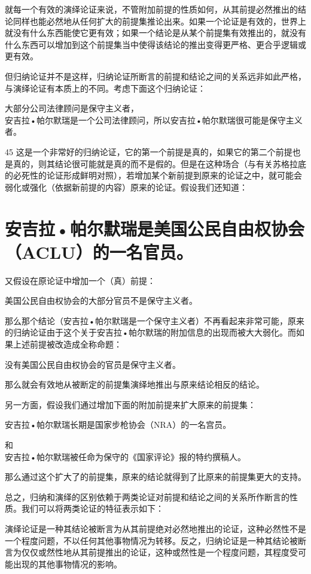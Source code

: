 就每一个有效的演绎论证来说，不管附加前提的性质如何，从其前提必然推出的结论同样也能必然地从任何扩大的前提集推论出来。如果一个论证是有效的，世界上就没有什么东西能使它更有效；如果一个结论是从某个前提集有效推出的，就没有什么东西可以增加到这个前提集当中使得该结论的推出变得更严格、更合乎逻辑或更有效。

但归纳论证并不是这样，归纳论证所断言的前提和结论之间的关系远非如此严格，与演绎论证有本质上的不同。考虑下面这个归纳论证：

\begin{displayquote}
大部分公司法律顾问是保守主义者，\\
安吉拉•帕尔默瑞是一个公司法律顾问，所以安吉拉•帕尔默瑞很可能是保守主义者。
\end{displayquote}

45 这是一个非常好的归纳论证，它的第一个前提是真的，如果它的第二个前提也是真的，则其结论很可能就是真的而不是假的。但是在这种场合（与有关苏格拉底的必死性的论证形成鲜明对照），若增加某个新前提到原来的论证之中，就可能会弱化或强化（依据新前提的内容）原来的论证。假设我们还知道：

\section*{安吉拉•帕尔默瑞是美国公民自由权协会（ACLU）的一名官员。}
又假设在原论证中增加一个（真）前提：

美国公民自由权协会的大部分官员不是保守主义者。

那么那个结论（安吉拉•帕尔默瑞是一个保守主义者）不再看起来非常可能，原来的归纳论证由于这个关于安吉拉•帕尔默瑞的附加信息的出现而被大大弱化。而如果上述前提被改造成全称命题：

没有美国公民自由权协会的官员是保守主义者。

那么就会有效地从被断定的前提集演绎地推出与原来结论相反的结论。

另一方面，假设我们通过增加下面的附加前提来扩大原来的前提集：

安吉拉•帕尔默瑞长期是国家步枪协会（NRA）的一名宫员。

和\\
安吉拉•帕尔默瑞被任命为保守的《国家评论》报的特约撰稿人。

那么通过这个扩大了的前提集，原来的结论就得到了比原来的前提集更大的支持。

总之，归纳和演绎的区别依赖于两类论证对前提和结论之间的关系所作断言的性质。我们可以将两类论证的特征表示如下：

演绎论证是一种其结论被断言为从其前提绝对必然地推出的论证，这种必然性不是一个程度问题，不以任何其他事物情况为转移。反之，归纳论证是一种其结论被断言为仅仅或然性地从其前提推出的论证，这种或然性是一个程度问题，其程度受可能出现的其他事物情况的影响。

